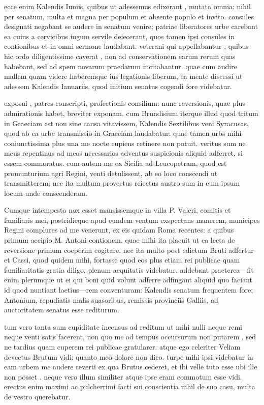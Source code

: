  ecce enim Kalendis Iuniis, quibus ut adessemus edixerant , mutata omnia: nihil per senatum, multa et magna per populum et absente populo et invito. consules designati negabant se audere in senatum venire; patriae liberatores urbe carebant ea cuius a cervicibus iugum servile deiecerant, quos tamen ipsi consules in contionibus et in omni sermone laudabant. veterani qui appellabantur , quibus hic ordo diligentissime caverat , non ad conservationem earum rerum quas habebant, sed ad spem novarum praedarum incitabantur. quae cum audire mallem quam videre haberemque ius legationis liberum, ea mente discessi ut adessem Kalendis Ianuariis, quod initium senatus cogendi fore videbatur.

 exposui , patres conscripti, profectionis consilium: nunc reversionis, quae plus admirationis habet, breviter exponam. cum Brundisium iterque illud quod tritum in Graeciam est non sine causa vitavissem, Kalendis Sextilibus veni Syracusas, quod ab ea urbe transmissio in Graeciam laudabatur: quae tamen urbs mihi coniunctissima plus una me nocte cupiens retinere non potuit. veritus sum ne meus repentinus ad meos necessarios adventus suspicionis aliquid adferret, si essem commoratus. cum autem me ex Sicilia ad Leucopetram, quod est promunturium agri Regini, venti detulissent, ab eo loco conscendi ut transmitterem; nec ita multum provectus reiectus austro sum in eum ipsum locum unde conscenderam.

 Cumque intempesta nox esset mansissemque in villa P. Valeri, comitis et familiaris mei, postridieque apud eundem ventum exspectans manerem, municipes Regini complures ad me venerunt, ex eis quidam Roma recentes: a quibus primum accipio M. Antoni contionem, quae mihi ita placuit ut ea lecta de reversione primum coeperim cogitare. nec ita multo post edictum Bruti adfertur et Cassi, quod quidem mihi, fortasse quod eos plus etiam rei publicae quam familiaritatis gratia diligo, plenum aequitatis videbatur. addebant praeterea—fit enim plerumque ut ei qui boni quid volunt adferre adfingant aliquid quo faciant id quod nuntiant laetius—rem conventuram: Kalendis senatum frequentem fore; Antonium, repudiatis malis suasoribus, remissis provinciis Galliis, ad auctoritatem senatus esse rediturum.

 tum vero tanta sum cupiditate incensus ad reditum ut mihi nulli neque remi neque venti satis facerent, non quo me ad tempus occursurum non putarem , sed ne tardius quam cuperem rei publicae gratularer. atque ego celeriter Veliam devectus Brutum vidi: quanto meo dolore non dico. turpe mihi ipsi videbatur in eam urbem me audere reverti ex qua Brutus cederet, et ibi velle tuto esse ubi ille non posset . neque vero illum similiter atque ipse eram commotum esse vidi. erectus enim maximi ac pulcherrimi facti sui conscientia nihil de suo casu, multa de vestro querebatur.

